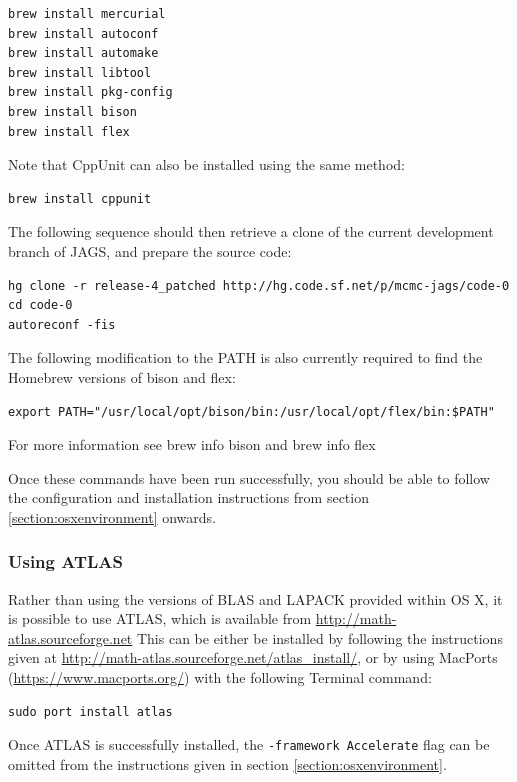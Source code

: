 \documentclass[11pt, a4paper, titlepage]{article}
\newcommand{\JAGS}{\textsf{JAGS}}
\newcommand{\code}[1]{{\bgroup{\normalfont\ttfamily #1}\egroup}}
\begin{document}
\begin{verbatim}
brew install mercurial
brew install autoconf
brew install automake
brew install libtool
brew install pkg-config
brew install bison
brew install flex
\end{verbatim}

Note that CppUnit can also be installed using the same method:

\begin{verbatim}
brew install cppunit
\end{verbatim}

The following sequence should then retrieve a clone of the current
development branch of \JAGS, and prepare the source code:

\begin{verbatim} 
hg clone -r release-4_patched http://hg.code.sf.net/p/mcmc-jags/code-0
cd code-0
autoreconf -fis
\end{verbatim}

The following modification to the \code{PATH} is also currently 
required to find the Homebrew versions of bison and flex:

\begin{verbatim} 
export PATH="/usr/local/opt/bison/bin:/usr/local/opt/flex/bin:$PATH"
\end{verbatim}

For more information see \code{brew info bison} and \code{brew info flex}

Once these commands have been run successfully, you should be able to follow 
the configuration and installation instructions from section \ref{section:osxenvironment} 
onwards.

\subsubsection{Using ATLAS}

Rather than using the versions of BLAS and LAPACK provided within OS X, it
is possible to use ATLAS, which is available from \url{http://math-atlas.sourceforge.net}
This can be either be installed by following the instructions given at
\url{http://math-atlas.sourceforge.net/atlas_install/}, or by using MacPorts 
(\url{https://www.macports.org/}) with the following Terminal command:

\begin{verbatim}
sudo port install atlas
\end{verbatim}

Once ATLAS is successfully installed, the \texttt{-framework Accelerate} flag can
be omitted from the instructions given in section \ref{section:osxenvironment}.
\end{document}
